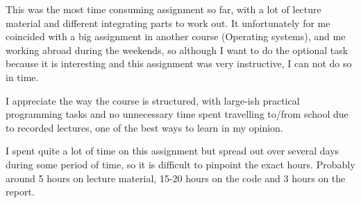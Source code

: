 \documentclass[a4paper]{scrartcl}
\begin{document}
This was the most time consuming assignment so far, with a lot of lecture material and different integrating parts to work out. It unfortunately for me coincided with a big assignment in another course (Operating systems), and me working abroad during the weekends, so although I want to do the optional task because it is interesting and this assignment was very instructive, I can not do so in time.

I appreciate the way the course is structured, with large-ish practical programming tasks and no unnecessary time spent travelling to/from school due to recorded lectures, one of the best ways to learn in my opinion.

I spent quite a lot of time on this assignment but spread out over several days during some period of time, so it is difficult to pinpoint the exact hours. Probably around 5 hours on lecture material, 15-20 hours on the code and 3 hours on the report.
\end{document}
